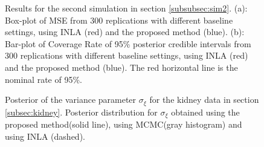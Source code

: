 \documentclass[ba]{imsart}
\begin{document}
\begin{figure}[ht]
\centering
{}
\caption{Results for the second simulation in section \ref{subsubsec:sim2}. (a): Box-plot of MSE from 300 replications with different baseline settings, using INLA (red) and the proposed method (blue). (b): Bar-plot of Coverage Rate of 95\% posterior credible intervals from 300 replications with different baseline settings, using INLA (red) and the proposed method (blue). The red horizontal line is the nominal rate of 95\%. }
\label{fig:Sim2Plot}
\end{figure}







\begin{figure}[ht]
  \centering
  \caption{Posterior of the variance parameter $\sigma_\xi$ for the kidney data in section \ref{subsec:kidney}. Posterior distribution for $\sigma_\xi$ obtained using the proposed method(solid line), using MCMC(gray histogram) and using INLA (dashed).}
  \label{fig:kidneyHyper}
  \end{figure}
  
\end{document}
